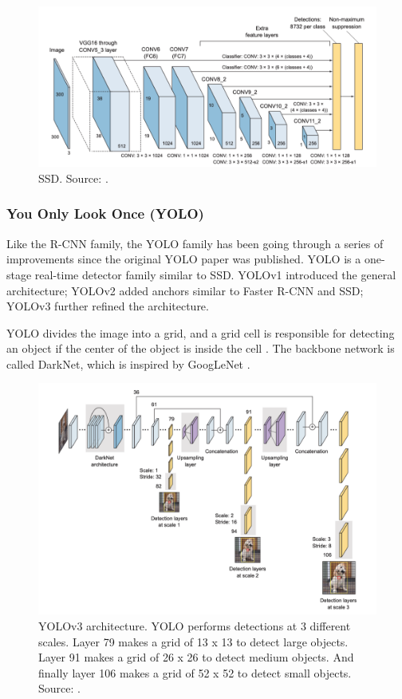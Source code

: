 \documentclass[a4paper, 11pt, oneside]{article}
\begin{document}
\begin{figure}[ht]
  \begin{center}
    \includegraphics[width=.8\textwidth]{ssd.png}
  \end{center}
  \caption{SSD. Source: \cite{elgendy2020deep}.}
\end{figure}

\subsubsection{You Only Look Once (YOLO)}

Like the R-CNN family, the YOLO family has been going through a series of improvements since the original YOLO paper
was published. YOLO is a one-stage real-time detector family similar to SSD. YOLOv1 \cite{redmon2016you} introduced the
general architecture; YOLOv2 \cite{redmon2017yolo9000} added anchors similar to Faster R-CNN and SSD; YOLOv3
\cite{redmon2018yolov3} further refined the architecture.

YOLO divides the image into a grid, and a grid cell is responsible for detecting an object if the center of the object
is inside the cell \cite{elgendy2020deep, redmon2016you}. The backbone network is called DarkNet, which is inspired by
GoogLeNet \cite{elgendy2020deep, redmon2016you}.

\begin{figure}[ht]
  \begin{center}
    \includegraphics[width=\textwidth]{yolov3.png}
  \end{center}
  \caption{YOLOv3 architecture. YOLO performs detections at 3 different scales. Layer 79 makes a grid of 13 x 13 to
  detect large objects. Layer 91 makes a grid of 26 x 26 to detect medium objects. And finally layer 106 makes a grid
  of 52 x 52 to detect small objects. Source: \cite{elgendy2020deep}.}
\end{figure}
\end{document}
